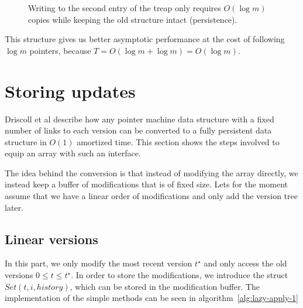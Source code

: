 \documentclass[11pt]{Thesis}
\theoremstyle{definition}
\newcommand{\figlabel}[1]{\label{fig:#1}}
\begin{document}
\begin{figure}
\caption[Treap for history storage]{\figlabel{treap}Writing to the second entry of the treap only requires
$O(\log m)$ copies while keeping the old structure intact (persistence).}
\end{figure}

This structure gives us better asymptotic performance at the cost of 
following $\log m$ pointers, because $T = O(\log m + \log m) = O(\log m)$.

\section{Storing updates}
Driscoll et al\cite{Dris89a} describe how any pointer machine data structure 
with a fixed number of links to each version can be converted to a fully 
persistent data structure in $O(1)$ amortized time. This section shows 
the steps involved to equip an array with such an interface.

The idea behind the conversion is that instead of modifying the array 
directly, we instead keep a buffer of modifications that is of fixed 
size. Lets for the moment assume that we have a linear order of modifications 
and only add the version tree later.

\subsection{Linear versions}
In this part, we only modify the most recent version $t^\star$ and only 
access the old versions $0 \leq t \leq t^\star$. In order to store the 
modifications, we introduce the struct $Set(t, i, history)$, which can be stored 
in the modification buffer. The implementation of the simple methods can be 
seen in algorithm~\ref{alg:lazy-apply-1}
\end{document}
